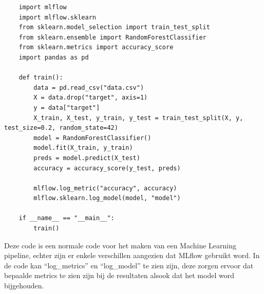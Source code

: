 \begin{verbatim}
    import mlflow
    import mlflow.sklearn
    from sklearn.model_selection import train_test_split
    from sklearn.ensemble import RandomForestClassifier
    from sklearn.metrics import accuracy_score
    import pandas as pd
    
    def train():
        data = pd.read_csv("data.csv")
        X = data.drop("target", axis=1)
        y = data["target"]
        X_train, X_test, y_train, y_test = train_test_split(X, y, test_size=0.2, random_state=42)
        model = RandomForestClassifier()
        model.fit(X_train, y_train)
        preds = model.predict(X_test)
        accuracy = accuracy_score(y_test, preds)
        
        mlflow.log_metric("accuracy", accuracy)
        mlflow.sklearn.log_model(model, "model")
    
    if __name__ == "__main__":
        train()
\end{verbatim}
Deze code is een normale code voor het maken van een Machine Learning pipeline, echter zijn er enkele verschillen aangezien dat MLflow gebruikt word.
In de code kan ``log\_metrics'' en ``log\_model'' te zien zijn, deze zorgen ervoor dat bepaalde metrics te zien zijn bij de resultaten alsook dat het model word bijgehouden.

